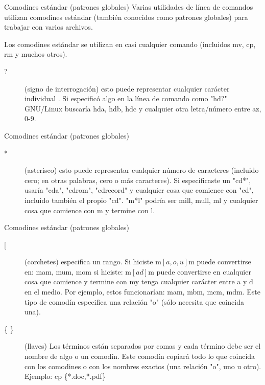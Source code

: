 \begin{frame}[c]{Comodines estándar (patrones globales)}
  Varias utilidades de línea de comandos utilizan comodines estándar
  (también conocidos como patrones globales) para trabajar con varios
  archivos.

  \vspace{\baselineskip}
  Los comodines estándar se utilizan en casi cualquier comando
  (incluidos mv, cp, rm y muchos otros).

  \begin{description}
    \item[?] (signo de interrogación) esto puede representar cualquier
      carácter individual . Si especificó algo en la línea de comando
      como "hd?" GNU/Linux buscaría hda, hdb, hdc y cualquier otra
      letra/número entre az, 0-9.
  \end{description}
\end{frame}

\begin{frame}[c]{Comodines estándar (patrones globales)}
  \begin{description}
    \item[*] (asterisco) esto puede representar cualquier número de
      caracteres (incluido cero; en otras palabras, cero o más caracteres).
      Si especificaste un "cd*", usaría "cda", "cdrom", "cdrecord" y
      cualquier cosa que comience con "cd", incluido también el propio "cd".
      "m*l" podría ser mill, mull, ml y cualquier cosa que comience con m y
      termine con l.
  \end{description}
\end{frame}

\begin{frame}[c]{Comodines estándar (patrones globales)}
  \begin{description}
    \item[ [ ] (corchetes) especifica un rango. Si hiciste m$[a,o,u]$m puede
      convertirse en: mam, mum, mom si hiciste: m$[ad]$m puede convertirse en
      cualquier cosa que comience y termine con my tenga cualquier carácter
      entre a y d en el medio. Por ejemplo, estos funcionarían: mam, mbm,
      mcm, mdm. Este tipo de comodín especifica una relación "o" (sólo
      necesita que coincida una).
    \item[\{ \}] (llaves) Los términos están separados por comas y cada
      término debe ser el nombre de algo o un comodín. Este comodín copiará
      todo lo que coincida con los comodines o con los nombres exactos (una
      relación "o", uno u otro). Ejemplo: cp \{*.doc,*.pdf\} ~
  \end{description}
\end{frame}

